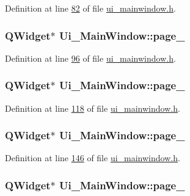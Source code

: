 Definition at line \hyperlink{a00139_source_l00082}{82} of file \hyperlink{a00139_source}{ui\+\_\+mainwindow.\+h}.

\hypertarget{a00080_ad52b1b3da7f1a695b9d3b521254c961d}{
\subsubsection[{page\+\_\+4}]{\setlength{\rightskip}{0pt plus 5cm}Q\+Widget$\ast$ Ui\+\_\+\+Main\+Window\+::page\+\_}}\label{a00080_ad52b1b3da7f1a695b9d3b521254c961d}


Definition at line \hyperlink{a00139_source_l00096}{96} of file \hyperlink{a00139_source}{ui\+\_\+mainwindow.\+h}.

\hypertarget{a00080_a421261d29369be60b551aabe8b097597}{
\subsubsection[{page\+\_\+5}]{\setlength{\rightskip}{0pt plus 5cm}Q\+Widget$\ast$ Ui\+\_\+\+Main\+Window\+::page\+\_}}\label{a00080_a421261d29369be60b551aabe8b097597}


Definition at line \hyperlink{a00139_source_l00118}{118} of file \hyperlink{a00139_source}{ui\+\_\+mainwindow.\+h}.

\hypertarget{a00080_a48c3dca01f963265cd2ffca998842e05}{
\subsubsection[{page\+\_\+6}]{\setlength{\rightskip}{0pt plus 5cm}Q\+Widget$\ast$ Ui\+\_\+\+Main\+Window\+::page\+\_}}\label{a00080_a48c3dca01f963265cd2ffca998842e05}


Definition at line \hyperlink{a00139_source_l00146}{146} of file \hyperlink{a00139_source}{ui\+\_\+mainwindow.\+h}.

\hypertarget{a00080_a2a58b14a203be787ef1600453f795d71}{
\subsubsection[{page\+\_\+7}]{\setlength{\rightskip}{0pt plus 5cm}Q\+Widget$\ast$ Ui\+\_\+\+Main\+Window\+::page\+\_}}\label{a00080_a2a58b14a203be787ef1600453f795d71}


